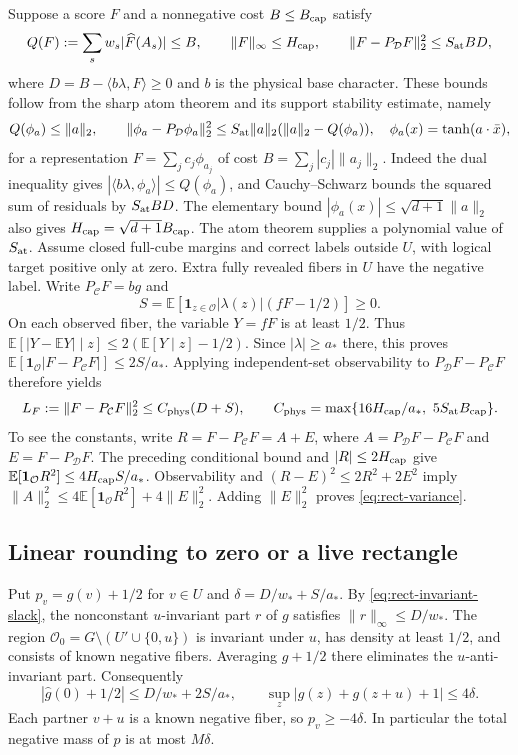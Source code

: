 Suppose a score $F$ and a nonnegative cost $B\le B_{\rm cap}$ satisfy
\[
 Q(F):=\sum_s w_s|\widehat F(A_s)|\le B,\qquad
 \|F\|_\infty\le H_{\rm cap},\qquad
 \|F-P_{\mathcal D}F\|_2^2\le S_{\rm at} B D,
\]
where $D=B-\langle b\lambda,F\rangle\ge0$ and $b$ is the physical
base character. These bounds follow from the sharp atom theorem and its support
stability estimate, namely
\[
 Q(\phi_a)\le\|a\|_2,\qquad
 \|\phi_a-P_{\mathcal D}\phi_a\|_2^2
 \le S_{\rm at}\|a\|_2(\|a\|_2-Q(\phi_a)),
 \quad \phi_a(x)=\tanh(a\cdot\bar x),
\]
for a representation $F=\sum_jc_j\phi_{a_j}$ of cost
$B=\sum_j|c_j|\|a_j\|_2$. Indeed the dual inequality gives
$|\langle b\lambda,\phi_a\rangle|\le Q(\phi_a)$, and
Cauchy--Schwarz bounds the squared sum of residuals by $S_{\rm at}BD$.
The elementary bound $|\phi_a(x)|\le\sqrt{d+1}\|a\|_2$ also gives
$H_{\rm cap}=\sqrt{d+1}B_{\rm cap}$. The atom theorem supplies
a polynomial value of $S_{\rm at}$.
Assume closed full-cube margins and correct labels outside $U$, with
logical target positive only at zero. Extra fully revealed fibers in
$U$ have the negative label. Write $P_{\mathcal C}F=bg$ and
\[
 S=\mathbb E[\mathbf1_{z\in\mathcal O}|\lambda(z)|
                         (fF-1/2)]\ge0.
\]
On each observed fiber, the variable $Y=fF$ is at least $1/2$.
Thus $\mathbb E[|Y-\mathbb EY|\mid z]\le
2(\mathbb E[Y\mid z]-1/2)$. Since $|\lambda|\ge a_*$ there,
this proves
$\mathbb E[\mathbf1_{\mathcal O}|F-P_{\mathcal C}F|]\le2S/a_*$.
Applying independent-set observability to
$P_{\mathcal D}F-P_{\mathcal C}F$ therefore yields
\begin{equation}\label{eq:rect-variance}
 L_F:=\|F-P_{\mathcal C}F\|_2^2
 \le C_{\rm phys}(D+S),\qquad
 C_{\rm phys}=\max\{16H_{\rm cap}/a_*,\ 5S_{\rm at}B_{\rm cap}\}.
\end{equation}
To see the constants, write $R=F-P_{\mathcal C}F=A+E$, where
$A=P_{\mathcal D}F-P_{\mathcal C}F$ and $E=F-P_{\mathcal D}F$.
The preceding conditional bound and $|R|\le2H_{\rm cap}$ give
$\mathbb E[\mathbf1_{\mathcal O}R^2]\le4H_{\rm cap}S/a_*$.
Observability and $(R-E)^2\le2R^2+2E^2$ imply
$\|A\|_2^2\le4\mathbb E[\mathbf1_{\mathcal O}R^2]+4\|E\|_2^2$.
Adding $\|E\|_2^2$ proves \eqref{eq:rect-variance}.

\subsection{Linear rounding to zero or a live rectangle}

Put $p_v=g(v)+1/2$ for $v\in U$ and
$\delta=D/w_*+S/a_*$. By \eqref{eq:rect-invariant-slack}, the nonconstant
$u$-invariant part $r$ of $g$ satisfies $\|r\|_\infty\le D/w_*$.
The region $\mathcal O_0=G\setminus(U'\cup\{0,u\})$ is invariant
under $u$, has density at least $1/2$, and consists of known negative
fibers. Averaging $g+1/2$ there eliminates the $u$-anti-invariant part.
Consequently
\[
 |\widehat g(0)+1/2|\le D/w_*+2S/a_*,\qquad
 \sup_z|g(z)+g(z+u)+1|\le4\delta.
\]
Each partner $v+u$ is a known negative fiber, so $p_v\ge-4\delta$.
In particular the total negative mass of $p$ is at most $M\delta$.

